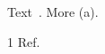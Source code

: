 \documentclass{article}
\DeclareRobustCommand{\pair}[1]{(#1)}
\begin{document}
Text~\cite{k}. More \pair{a}.
\begin{thebibliography}{1} Ref.\end{thebibliography}
\end{document}
